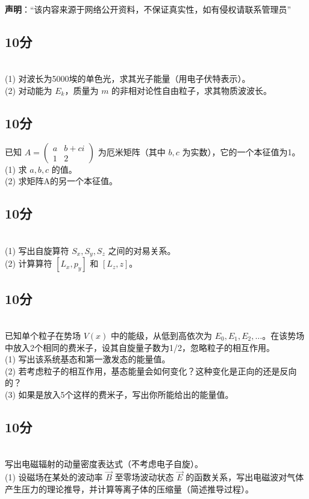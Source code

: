 
\textbf{声明}：“该内容来源于网络公开资料，不保证真实性，如有侵权请联系管理员”

\subsection{10分}\\
(1) 对波长为5000埃的单色光，求其光子能量（用电子伏特表示）。\\
(2) 对动能为 $E_k$，质量为 $m$ 的非相对论性自由粒子，求其物质波波长。
\subsection{10分}
已知 $A = \begin{pmatrix} a & b+ci \\ 1 & 2 \end{pmatrix}$ 为厄米矩阵（其中 $ b, c$ 为实数），它的一个本征值为1。\\
(1) 求 $a, b, c$ 的值。\\
(2) 求矩阵A的另一个本征值。
\subsection{10分}\\
(1) 写出自旋算符 $S_x, S_y, S_z$ 之间的对易关系。\\
(2) 计算算符 $[L_x, p_y]$ 和 $[L_z, z]$。
\subsection{10分}\\
已知单个粒子在势场 $V(x)$ 中的能级，从低到高依次为 $E_0, E_1, E_2, \dots$。在该势场中放入2个相同的费米子，设其自旋量子数为1/2，忽略粒子的相互作用。\\
(1) 写出该系统基态和第一激发态的能量值。\\
(2) 若考虑粒子的相互作用，基态能量会如何变化？这种变化是正向的还是反向的？\\
(3) 如果是放入5个这样的费米子，写出你所能给出的能量值。
\subsection{10分}\\
写出电磁辐射的动量密度表达式（不考虑电子自旋）。\\
(1) 设磁场在某处的波动率 $\vec{B}$ 至零场波动状态 $\vec{E}$ 的函数关系，写出电磁波对气体产生压力的理论推导，并计算等离子体的压缩量（简述推导过程）。